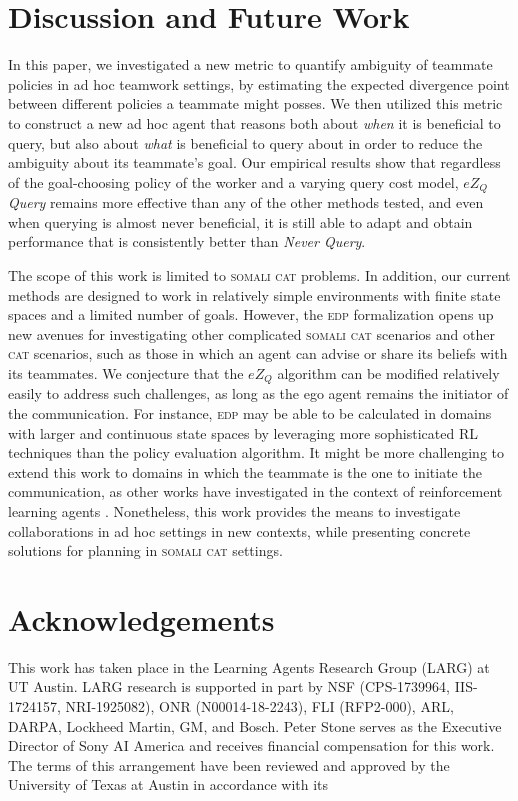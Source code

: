\documentclass[letterpaper]{article}
\begin{document}
\section{Discussion and Future Work}
In this paper, we investigated a new metric to quantify ambiguity of teammate policies in ad hoc teamwork settings, by estimating the expected divergence point between different policies a teammate might posses. We then utilized this metric to construct a new ad hoc agent that reasons both about \emph{when} it is beneficial to query, but also about \emph{what} is beneficial to query about in order to reduce the ambiguity about its teammate's goal. Our empirical results show that regardless of the goal-choosing policy of the worker and a varying query cost model, \emph{$eZ_Q$ Query} remains more effective than any of the other methods tested, and even when querying is almost never beneficial, it is still able to adapt and obtain performance that is consistently better than \emph{Never Query}.

The scope of this work is limited to \textsc{somali cat} problems. In addition, our current methods are designed to work in relatively simple environments with finite state spaces and a limited number of goals. However, the \textsc{edp} formalization opens up new avenues for investigating other %
complicated \textsc{somali cat} scenarios and other \textsc{cat} scenarios, such as those in which an agent can advise or share its beliefs with its teammates. We conjecture that the $eZ_Q$ algorithm can be modified relatively easily to address such challenges, as long as the ego agent remains the initiator of the communication. For instance, \textsc{edp} may be able to be calculated in domains with larger and continuous state spaces by leveraging more sophisticated RL techniques than the policy evaluation algorithm. It might be more challenging to extend this work to domains in which the teammate is the one to initiate the communication, as other works have investigated in the context of reinforcement learning agents \cite{torrey2013teaching,cui2018active}. Nonetheless, this work provides the means to investigate collaborations in ad hoc settings in new contexts, while presenting concrete solutions for planning in \textsc{somali cat} settings.

\section*{Acknowledgements}
This work has taken place in the Learning Agents Research
Group (LARG) at UT Austin.  LARG research is supported in part by NSF
(CPS-1739964, IIS-1724157, NRI-1925082), ONR (N00014-18-2243), FLI
(RFP2-000), ARL, DARPA, Lockheed Martin, GM, and Bosch.  Peter Stone
serves as the Executive Director of Sony AI America and receives
financial compensation for this work.  The terms of this arrangement
have been reviewed and approved by the University of Texas at Austin
in accordance with its


\clearpage


\end{document}
